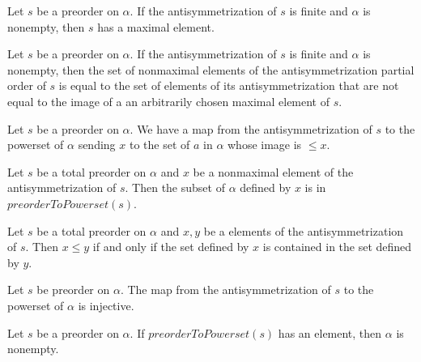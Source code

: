 \begin{sublemma}
Let $s$ be a preorder on $\alpha$. If the antisymmetrization of $s$ is finite and $\alpha$ is nonempty, then $s$ has a maximal element.

\end{sublemma}

\begin{sublemma}
Let $s$ be a preorder on $\alpha$. If the antisymmetrization of $s$ is finite and $\alpha$ is nonempty, then the set of nonmaximal elements of 
the antisymmetrization partial order of $s$ is equal to the set of elements of its antisymmetrization that are not equal to the image of a
an arbitrarily chosen maximal element of $s$.

\end{sublemma}

\begin{sublemma}
Let $s$ be a preorder on $\alpha$. We have a map from the antisymmetrization of $s$ to the powerset of $\alpha$ sending $x$ to the set
of $a$ in $\alpha$ whose image is $\le x$.

\end{sublemma}

\begin{sublemma}
Let $s$ be a total preorder on $\alpha$ and $x$ be a nonmaximal element of the antisymmetrization of $s$. Then the subset of $\alpha$
defined by $x$ is in $preorderToPowerset(s)$.

\end{sublemma}

\begin{sublemma}
Let $s$ be a total preorder on $\alpha$ and $x,y$ be a elements of the antisymmetrization of $s$. Then $x\le y$ if and only if
the set defined by $x$ is contained in the set defined by $y$.

\end{sublemma}

\begin{sublemma}
Let $s$ be preorder on $\alpha$. The map from the antisymmetrization of $s$ to the powerset of $\alpha$ is injective.

\end{sublemma}

\begin{sublemma}
Let $s$ be a preorder on $\alpha$. If $preorderToPowerset(s)$ has an element, then $\alpha$ is nonempty.

\end{sublemma}

